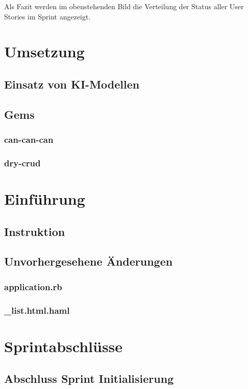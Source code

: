 Als Fazit werden im obenstehenden Bild die Verteilung der Status aller User Stories im Sprint angezeigt.

\newpage

\chapter{Umsetzung}
\section{Einsatz von KI-Modellen}
\section{Gems}
\subsection{can-can-can}
\subsection{dry-crud}

\chapter{Einführung}

\section{Instruktion}

\section{Unvorhergesehene Änderungen}
\subsection{application.rb}
\subsection{\_list.html.haml}

\chapter{Sprintabschlüsse}

\section{Abschluss Sprint Initialisierung}
